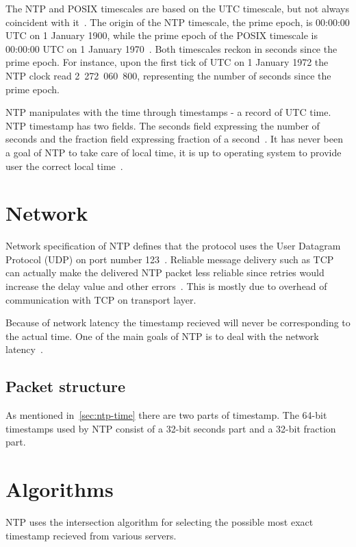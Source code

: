 The NTP and POSIX timescales are based on the UTC timescale,
but not always coincident with it~\cite{ntp-leap}.
The origin of the NTP timescale, the prime epoch, is 00:00:00 UTC on 1 January 1900,
while the prime epoch of the POSIX timescale is 00:00:00 UTC on 1 January 1970~\cite{ntp-leap}.
Both timescales reckon in seconds since the prime epoch.
For instance, upon the first tick of UTC on 1 January 1972 the NTP clock read 2~272~060~800,
representing the number of seconds since the prime epoch.

NTP manipulates with the time through timestamps - a record of UTC time.
NTP timestamp has two fields. The seconds field expressing the number of seconds
and the fraction field expressing fraction of a second~\cite{rfc5905}.
It has never been a goal of NTP to take care of local time,
it is up to operating system to provide user the correct local time~\cite{ntp-overview}.

\section{Network}\label{sec:ntp-network}
Network specification of NTP defines that
the protocol uses the User Datagram Protocol (UDP) on port number 123~\cite{rfc5905, ianna-ports}.
Reliable message delivery such as TCP can actually make the delivered NTP packet less reliable since retries
would increase the delay value and other errors~\cite{rfc5905}.
This is mostly due to overhead of communication with TCP on transport layer.

Because of network latency the timestamp recieved will never be corresponding to
the actual time.
One of the main goals of NTP is to deal with the network latency~\cite{ntp-overview}.

\subsection{Packet structure}\label{subsec:ntp-packet}
As mentioned in~\ref{sec:ntp-time} there are two parts of timestamp.
The 64-bit timestamps used by NTP consist of a 32-bit seconds part and a 32-bit fraction part.

\section{Algorithms}
NTP uses the intersection algorithm for selecting the possible most exact timestamp recieved
from various servers.
